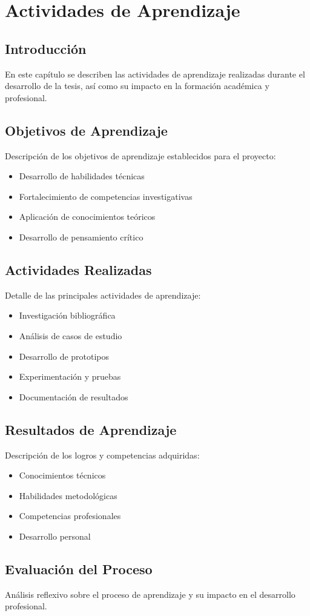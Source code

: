 \chapter{Actividades de Aprendizaje}

\section{Introducción}
En este capítulo se describen las actividades de aprendizaje realizadas durante el desarrollo de la tesis, así como su impacto en la formación académica y profesional.

\section{Objetivos de Aprendizaje}
Descripción de los objetivos de aprendizaje establecidos para el proyecto:
\begin{itemize}
    \item Desarrollo de habilidades técnicas
    \item Fortalecimiento de competencias investigativas
    \item Aplicación de conocimientos teóricos
    \item Desarrollo de pensamiento crítico
\end{itemize}

\section{Actividades Realizadas}
Detalle de las principales actividades de aprendizaje:
\begin{itemize}
    \item Investigación bibliográfica
    \item Análisis de casos de estudio
    \item Desarrollo de prototipos
    \item Experimentación y pruebas
    \item Documentación de resultados
\end{itemize}

\section{Resultados de Aprendizaje}
Descripción de los logros y competencias adquiridas:
\begin{itemize}
    \item Conocimientos técnicos
    \item Habilidades metodológicas
    \item Competencias profesionales
    \item Desarrollo personal
\end{itemize}

\section{Evaluación del Proceso}
Análisis reflexivo sobre el proceso de aprendizaje y su impacto en el desarrollo profesional.